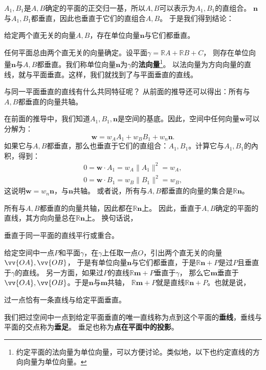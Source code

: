 \documentclass[12pt,UTF8]{ctexbook}
\begin{document}
$A_1,B_1$是$A,B$确定的平面的正交归一基，所以$A,B$可以表示为$A_1,B_1$的直组合。
$\mathbf{n}$与$A_1,B_1$都垂直，因此也垂直于它们的直组合$A,B$。
于是我们得到结论：
\begin{tm}\label{tm:1-3-30}
    给定两个直无关的向量$A,B$，存在单位向量$\mathbf{n}$与它们都垂直。
\end{tm}
任何平面总由两个直无关的向量确定。设平面$\gamma = \mathbb{R}A + \mathbb{R}B + C$，
则存在单位向量$\mathbf{n}$与$A,B$都垂直。我们称单位向量$\mathbf{n}$为$\gamma$的\textbf{法向量}\footnote{约定平面的法向量为单位向量，可以方便讨论。类似地，以下也约定直线的方向向量为单位向量。}。
以法向量为方向向量的直线，就与平面垂直。这样，我们就找到了与平面垂直的直线。

与同一平面垂直的直线有什么共同特征呢？
从前面的推导还可以得出：所有与$A,B$都垂直的向量共轴。

在前面的推导中，我们知道$A_1,B_1,\mathbf{n}$是空间的基底。因此，空间中任何向量$\mathbf{w}$可以分解为：
$$ \mathbf{w} = w_A A_1 + w_B B_1 + w_n \mathbf{n}. $$
如果它与$A,B$都垂直，那么也垂直于它们的直组合：$A_1,B_1$。计算它与$A_1,B_1$的內积，得到：
\begin{align*}
    0 = \mathbf{w}\cdot A_1  = w_A\|A_1\|^2 = w_A,  \\
    0 = \mathbf{w}\cdot B_1  = w_B\|B_1\|^2 = w_B,  
\end{align*}
这说明$\mathbf{w} = w_n \mathbf{n}$，与$\mathbf{n}$共轴。
或者说，所有与$A,B$都垂直的向量的集合是$\mathbb{R}\mathbf{n}$。

所有与$A,B$都垂直的向量共轴，因此都在$\mathbb{R}\mathbf{n}$上。
因此，垂直于$A,B$确定的平面的直线，其方向向量总在$\mathbb{R}\mathbf{n}$上。
换句话说，
\begin{tm}\label{tm:1-3-40}
    垂直于同一平面的直线平行或重合。
\end{tm}
给定空间中一点$P$和平面$\gamma$，在$\gamma$上任取一点$O$，引出两个直无关的向量$\vv{OA},\vv{OB}$，
于是有单位向量$\mathbf{n}$与它们都垂直，于是$\mathbb{R}\mathbf{n} + P$是过$P$且垂直于$\gamma$的直线。
另一方面，如果过$P$的直线$\mathbb{R}\mathbf{m} + P$垂直于$\gamma$，
那么它$\mathbf{m}$垂直于$\vv{OA},\vv{OB}$。于是$\mathbf{n}$与$\mathbf{m}$共轴，
$\mathbb{R}\mathbf{m} + P$就是直线$\mathbb{R}\mathbf{n} + P$。也就是说，
\begin{tm}\label{tm:1-3-50}
    过一点恰有一条直线与给定平面垂直。
\end{tm}
我们把过空间中一点到给定平面垂直的唯一直线称为点到这个平面的\textbf{垂线}，垂线与平面的交点称为\textbf{垂足}。
垂足也称为\textbf{点在平面中的投影}。
\end{document}

